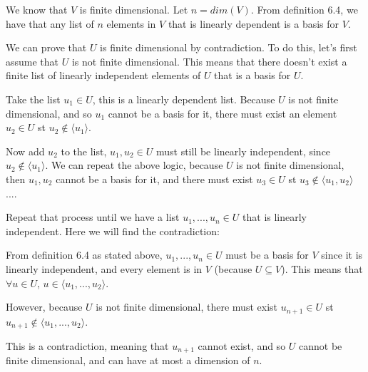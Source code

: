 \documentclass[12pt]{article} %
\begin{document}
\begin{homeworkProblem}

    We know that $V$ is finite dimensional. Let $n = dim(V)$. From definition 6.4, we have that any list of $n$ elements in $V$ that is linearly dependent is a basis for $V$.

    We can prove that $U$ is finite dimensional by contradiction. To do this, let's first assume that $U$ is not finite dimensional. This means that there doesn't exist a finite list of linearly
    independent elements of $U$ that is a basis for $U$.

    Take the list $u_1 \in U$, this is a linearly dependent list. Because $U$ is not finite dimensional, and so $u_1$ cannot be a basis for it, there must exist an element $u_2 \in U$ st $u_2 \not \in \langle u_1 \rangle$.

    Now add $u_2$ to the list, $u_1, u_2 \in U$ must still be linearly independent, since $u_2 \not \in \langle u_1 \rangle$. We can repeat the above logic, because $U$ is not finite dimensional,
    then $u_1, u_2$ cannot be a basis for it, and there must exist $u_3 \in U$ st $u_3 \not \in \langle u_1, u_2 \rangle$ ....

    Repeat that process until we have a list $u_1, ..., u_n \in U$ that is linearly independent. Here we will find the contradiction:

    From definition 6.4 as stated above, $u_1, ..., u_n \in U$ must be a basis for $V$ since it is linearly independent, and every element is in $V$ (because $U \subseteq V$). This means
    that $\forall u \in U$, $u \in \langle u_1, ..., u_2 \rangle$.

    However, because $U$ is not finite dimensional, there must exist $u_{n + 1} \in U$ st $u_{n + 1} \not \in \langle u_1, ..., u_2 \rangle$.

    This is a contradiction, meaning that $u_{n+1}$ cannot exist, and so $U$ cannot be finite dimensional, and can have at most a dimension of $n$.


\end{homeworkProblem}
\pagebreak
\end{document}
